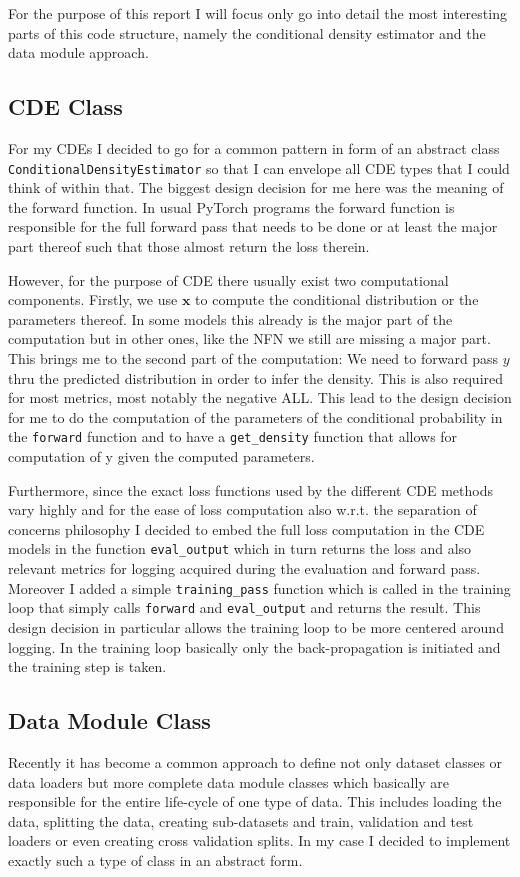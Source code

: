 \documentclass{article}
\begin{document}
For the purpose of this report I will focus only go into detail the most interesting parts of this code structure, namely the conditional density estimator and the data module approach.

\subsection{CDE Class}
For my CDEs I decided to go for a common pattern in form of an abstract class \texttt{ConditionalDensityEstimator} so that I can envelope all CDE types that I could think of within that. The biggest design decision for me here was the meaning of the forward function. In usual PyTorch programs the forward function is responsible for the full forward pass that needs to be done or at least the major part thereof such that those almost return the loss therein.

However, for the purpose of CDE there usually exist two computational components. Firstly, we use $\mathbf{x}$ to compute the conditional distribution or the parameters thereof. In some models this already is the major part of the computation but in other ones, like the NFN we still are missing a major part. This brings me to the second part of the computation: We need to forward pass $y$ thru the predicted distribution in order to infer the density. This is also required for most metrics, most notably the negative ALL.
This lead to the design decision for me to do the computation of the parameters of the conditional probability in the \texttt{forward} function and to have a \texttt{get\_density} function that allows for computation of y given the computed parameters.

Furthermore, since the exact loss functions used by the different CDE methods vary highly and for the ease of loss computation also w.r.t. the separation of concerns philosophy I decided to embed the full loss computation in the CDE models in the function \texttt{eval\_output} which in turn returns the loss and also relevant metrics for logging acquired during the evaluation and forward pass. Moreover I added a simple \texttt{training\_pass} function which is called in the training loop that simply calls \texttt{forward} and \texttt{eval\_output} and returns the result. This design decision in particular allows the training loop to be more centered around logging. In the training loop basically only the back-propagation is initiated and the training step is taken.

\subsection{Data Module Class}
Recently it has become a common approach to define not only dataset classes or data loaders but more complete data module classes which basically are responsible for the entire life-cycle of one type of data. This includes loading the data, splitting the data, creating sub-datasets and train, validation and test loaders or even creating cross validation splits. In my case I decided to implement exactly such a type of class in an abstract form.
\end{document}
